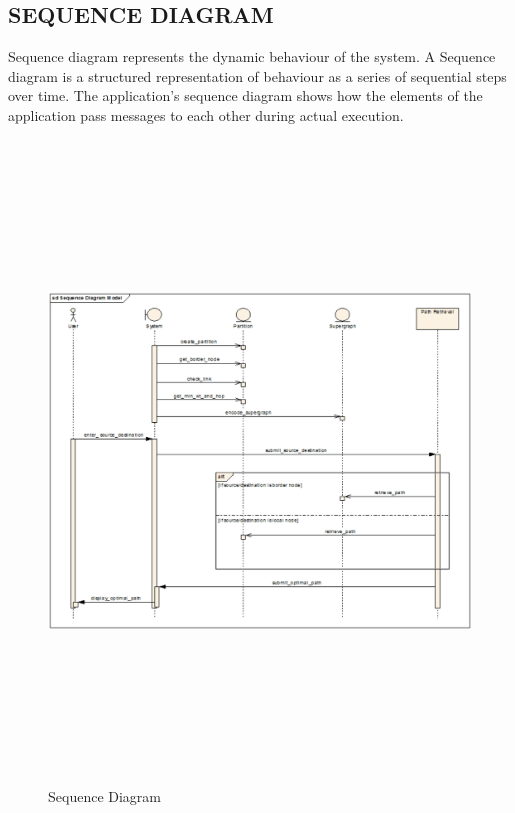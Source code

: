 \begin{center}
\section{\normalsize SEQUENCE DIAGRAM}
\hspace{5mm} Sequence diagram represents the dynamic behaviour of the system. A Sequence diagram is a structured representation of behaviour as a series of sequential steps over time. The application’s sequence diagram shows how the elements of the application pass messages to each other during actual execution.\\
\begin{figure}[H]
\includegraphics[width=17cm,height=17cm]{seq.eps}
\caption{Sequence Diagram}
\end{figure}
\newpage


\end{center}
